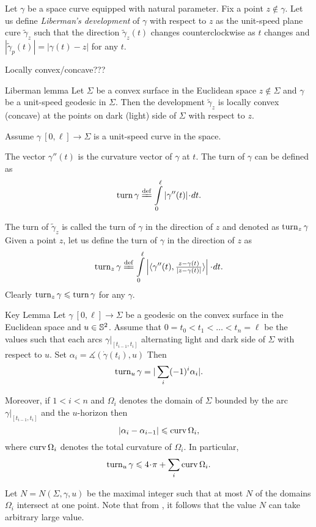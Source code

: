 \documentclass[a4paper,10pt]{amsart}
\begin{document}
Let $\gamma$ be a space curve equipped with natural parameter.
Fix a point $z\notin\gamma$. 
Let us define \emph{Liberman's development} of $\gamma$ with respect to $z$ as the unit-speed plane cure $\tilde\gamma_z$ such that the direction $\tilde\gamma_z(t)$
changes counterclockwise as $t$ changes
and
$|\tilde\gamma_p(t)|=|\gamma(t)-z|$ for any $t$.

Locally convex/concave???


\begin{thm}{Liberman lemma}\label{lem:liberman}
Let $\Sigma$ be a convex surface in the Euclidean space 
$z\not\in\Sigma$ and $\gamma$ be a unit-speed geodesic in $\Sigma$.
Then the development $\tilde\gamma_z$ is locally convex (concave) 
at the points on dark (light) side of $\Sigma$ with respect to $z$.
\end{thm}

Assume $\gamma\:[0,\ell]\to \Sigma$ is a unit-speed curve in the space.

The vector $\gamma''(t)$ is the curvature vector of $\gamma$ at $t$.
The turn of $\gamma$ can be defined as 
\[\turn\gamma\df\int\limits_0^\ell|\gamma''(t)|\cdot dt.\]

The turn of $\tilde\gamma_z$ is called the turn of $\gamma$ in the direction of $z$ and denoted as $\mathop{\rm turn}\nolimits_z\gamma$
Given a point $z$, let us define the turn of $\gamma$ in the direction of $z$ as
\[\turn_z\gamma
\df
\int\limits_0^\ell
\left|
\langle\gamma''(t),\tfrac{z-\gamma(t)}{|z-\gamma(t)|}\rangle
\right|
\cdot dt.\]
Clearly $\mathop{\rm turn}\nolimits_z\gamma\leqslant \mathop{\rm turn}\nolimits \gamma$ for any $\gamma$.

\begin{thm}{Key Lemma}
\label{lem:key}
Let $\gamma\:[0,\ell]\to \Sigma$ be a geodesic on the convex surface in the Euclidean space 
and $u\in\mathbb{S}^2$.
Assume that $0=t_0<t_1<\dots<t_n=\ell$ be the values such that each arcs $\gamma|_{[t_{i-1},t_i]}$ alternating light and dark side of $\Sigma$ with respect to $u$.
Set $\alpha_i=\measuredangle(\dot\gamma(t_i),u)$
Then 
\[\mathop{\rm turn}\nolimits_u\gamma=|\sum_i(-1)^i\alpha_i|.\]

Moreover, if $1<i<n$ 
and $\Omega_i$ denotes the domain of $\Sigma$ bounded by the arc $\gamma|_{[t_{i-1},t_i]}$ and the $u$-horizon then 
\[|\alpha_i-\alpha_{i-1}|\leqslant \mathop{\rm curv}\nolimits\Omega_i,\]
where $\mathop{\rm curv}\nolimits\Omega_i$ denotes the total curvature of $\Omega_i$.
In particular,
\[\turn_u\gamma\le 4\cdot\pi+\sum_i\curv\Omega_i.\]
\end{thm}

Let $N=N(\Sigma,\gamma, u)$ be the maximal integer such that at most $N$ of the domains $\Omega_i$ intersect at one point.
Note that from \cite{BKZ}, it follows that the value $N$ can take arbitrary large value.
\end{document}

